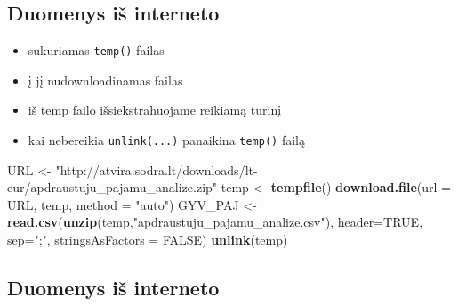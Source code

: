 \documentclass[]{article}
\newenvironment{Shaded}{\begin{snugshade}}{\end{snugshade}}
\newcommand{\KeywordTok}[1]{\textcolor[rgb]{0.13,0.29,0.53}{\textbf{#1}}}
\newcommand{\DataTypeTok}[1]{\textcolor[rgb]{0.13,0.29,0.53}{#1}}
\newcommand{\StringTok}[1]{\textcolor[rgb]{0.31,0.60,0.02}{#1}}
\newcommand{\OtherTok}[1]{\textcolor[rgb]{0.56,0.35,0.01}{#1}}
\newcommand{\NormalTok}[1]{#1}
\providecommand{\tightlist}{%
  \setlength{\itemsep}{0pt}\setlength{\parskip}{0pt}}
\begin{document}
\subsection{Duomenys iš interneto}\label{duomenys-is-interneto-4}

\begin{itemize}
\tightlist
\item
  sukuriamas \texttt{temp()} failas
\item
  į jį nudownloadinamas failas
\item
  iš temp failo išsiekstrahuojame reikiamą turinį
\item
  kai nebereikia \texttt{unlink(...)} panaikina \texttt{temp()} failą
\end{itemize}

\begin{Shaded}
\begin{Highlighting}[]
\NormalTok{URL <-}\StringTok{ "http://atvira.sodra.lt/downloads/lt-eur/apdraustuju_pajamu_analize.zip"}
\NormalTok{temp <-}\StringTok{ }\KeywordTok{tempfile}\NormalTok{()}
\KeywordTok{download.file}\NormalTok{(}\DataTypeTok{url =}\NormalTok{ URL, temp, }\DataTypeTok{method =} \StringTok{"auto"}\NormalTok{)}
\NormalTok{GYV_PAJ <-}\StringTok{ }\KeywordTok{read.csv}\NormalTok{(}\KeywordTok{unzip}\NormalTok{(temp,}\StringTok{"apdraustuju_pajamu_analize.csv"}\NormalTok{),}
                 \DataTypeTok{header=}\OtherTok{TRUE}\NormalTok{,}
                 \DataTypeTok{sep=}\StringTok{";"}\NormalTok{,}
                 \DataTypeTok{stringsAsFactors =} \OtherTok{FALSE}\NormalTok{) }
\KeywordTok{unlink}\NormalTok{(temp)}
\end{Highlighting}
\end{Shaded}

\subsection{Duomenys iš interneto}\label{duomenys-is-interneto-5}
\end{document}
